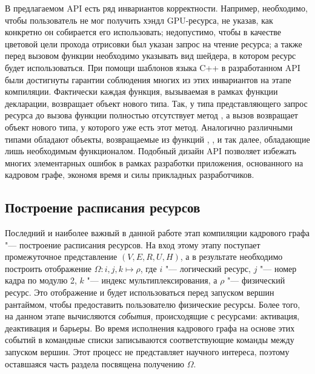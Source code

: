 В предлагаемом API есть ряд инвариантов корректности.
Например, необходимо, чтобы пользователь не мог получить хэндл GPU-ресурса, не указав, как конкретно он собирается его использовать; недопустимо, чтобы в качестве цветовой цели прохода отрисовки был указан запрос на чтение ресурса; а также перед вызовом функции  необходимо указывать вид шейдера, в котором ресурс будет использоваться.
При помощи шаблонов языка C++ в разработанном API были достигнуты гарантии соблюдения многих из этих инвариантов на этапе компиляции.
Фактически каждая функция, вызываемая в рамках функции декларации, возвращает объект нового типа.
Так, у типа представляющего запрос ресурса до вызова функции  полностью отсутствует метод , а вызов  возвращает объект нового типа, у которого уже есть этот метод.
Аналогично различными типами обладают объекты, возвращаемые из функций , ,  и так далее, обладающие лишь необходимым функционалом.
Подобный дизайн API позволяет избежать многих элементарных ошибок в рамках разработки приложения, основанного на кадровом графе, экономя время и силы прикладных разработчиков.

\subsection{Построение расписания ресурсов}
Последний и наиболее важный в данной работе этап компиляции кадрового графа "--- построение расписания ресурсов.
На вход этому этапу поступает промежуточное представление $(V, E, R, U, H)$, а в результате необходимо построить отображение $\Omega : i, j, k \mapsto \rho$, где $i$ "--- логический ресурс, $j$ "--- номер кадра по модулю 2, $k$ "--- индекс мультиплексирования, а $\rho$ "--- физический ресурс.
Это отображение и будет использоваться перед запуском вершин рантаймом, чтобы предоставить пользователю физические ресурсы.
Более того, на данном этапе вычисляются \textit{события}, происходящие с ресурсами: активация, деактивация и барьеры.
Во время исполнения кадрового графа на основе этих событий в командные списки записываются соответствующие команды между запуском вершин.
Этот процесс не представляет научного интереса, поэтому оставшаяся часть раздела посвящена получению $\Omega$.

